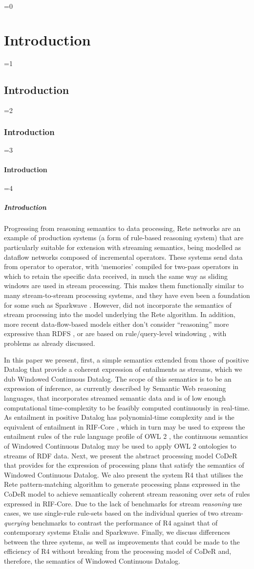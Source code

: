 \documentclass[twocolumn,preprint,3p,number]{elsarticle}
\theoremstyle{plain}
\theoremstyle{definition}
\newcounter{nestingdepth}
\newenvironment{nestedsection}[2]{
  \ifnum\value{nestingdepth}=0
    \chapter{#1}
  \else
    \ifnum\value{nestingdepth}=1
      \section{#1}
    \else
      \ifnum\value{nestingdepth}=2
        \subsection{#1}
      \else
        \ifnum\value{nestingdepth}=3
          \subsubsection{#1}
        \else
          \ifnum\value{nestingdepth}=4
            \paragraph{#1}
          \else
            \PackageError{nestedsections}{Maximum nesting level exceeded!}{uh oh!}
          \fi
        \fi
      \fi
    \fi
  \fi
  \addtocounter{nestingdepth}{1}
  \label{sec:#2}
}{\addtocounter{nestingdepth}{-1}}
\begin{document}
\begin{nestedsection}{Introduction}{intro}
  Progressing from reasoning semantics to data processing, Rete networks \citep{forgy79} are an example of production systems (a form of rule-based reasoning system) that are particularly suitable for extension with streaming semantics, being modelled as dataflow networks composed of incremental operators.
  These systems send data from operator to operator, with `memories' compiled for two-pass operators in which to retain the specific data received, in much the same way as sliding windows are used in stream processing.
  This makes them functionally similar to many stream-to-stream processing systems, and they have even been a foundation for some such as Sparkwave \citep{sparkwave}.
  However, \citet{forgy79} did not incorporate the semantics of stream processing into the model underlying the Rete algorithm.
  In addition, more recent data-flow-based models either don't consider ``reasoning'' more expressive than RDFS \citep{sparkwave}, or are based on rule/query-level windowing \citep{C-SPARQL,walavalkar08streamingkb}, with problems as already discussed.

  In this paper we present, first, a simple semantics extended from those of positive Datalog that provide a coherent expression of entailments as streams, which we dub Windowed Continuous Datalog.
  The scope of this semantics is to be an expression of inference, as currently described by Semantic Web reasoning languages, that incorporates streamed semantic data and is of low enough computational time-complexity to be feasibly computed continuously in real-time.
  As entailment in positive Datalog has polynomial-time complexity and is the equivalent of entailment in RIF-Core \citep{w3crifcore}, which in turn may be used to express the entailment rules of the rule language profile of OWL 2 \citep{w3cowl2profiles}, the continuous semantics of Windowed Continuous Datalog may be used to apply OWL 2 ontologies to streams of RDF data.
  Next, we present the abstract processing model CoDeR that provides for the expression of processing plans that satisfy the semantics of Windowed Continuous Datalog.
  We also present the system R4 that utilises the Rete pattern-matching algorithm to generate processing plans expressed in the CoDeR model to achieve semantically coherent stream reasoning over sets of rules expressed in RIF-Core.
  Due to the lack of benchmarks for stream \emph{reasoning} use cases, we use single-rule rule-sets based on the individual queries of two stream-\emph{querying} benchmarks to contrast the performance of R4 against that of contemporary systems Etalis and Sparkwave.
  Finally, we discuss differences between the three systems, as well as improvements that could be made to the efficiency of R4 without breaking from the processing model of CoDeR and, therefore, the semantics of Windowed Continuous Datalog.
\end{nestedsection}
\end{document}

